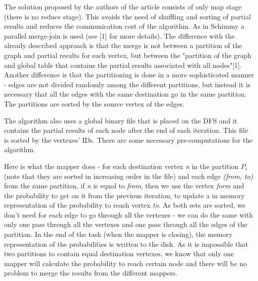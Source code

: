 \documentclass[12pt]{article}
\theoremstyle{plain}
\begin{document}
  The solution proposed by the authors of the article consists of only map
  stage (there is no reduce stage).  This avoids the need of shuffling and
  sorting of partial results and reduces the communication cost of the
  algorithm. As in Schimmy a parallel merge-join is used (see [1] for more
  details). The difference with the already described approach is that the
  merge is not between a partition of the graph and partial results for each
  vertex, but between the "partition of the graph and global table that
  contains the partial results associated with all nodes"[1]. Another
  difference is that the partitioning is done in a more sophisticated manner -
  edges are not divided randomly among the different partitions, but instead it
  is necessary that all the edges with the same destination go in the same
  partition. The partitions are sorted by the source vertex of the edges. 

  The algorithm also uses a global binary file that is placed on the DFS and it
  contains the partial results of each node after the end of each iteration. 
  This file is sorted by the vertexes' IDs. There are some necessary
  pre-computations for the algorithm.  

  Here is what the mapper does - for each destination vertex \emph{n} in the
  partition $P_i$ (note that they are sorted in increasing order in the file)
  and each edge \emph{(from, to)} from the same partition, if \emph{n} is equal
  to \emph{from}, then we use the vertex \emph{form} and the probability to
  get on it from the previous iteration, to update a in memory representation
  of the probability to reach vertex \emph{to}. As both sets are sorted, we
  don't need for each edge to go through all the vertexes - we can do the same
  with only one pass through all the vertexes and one pass through all the
  edges of the partition. In the end of the task (when the mapper is closing),
  the memory representation of the probabilities is written to the disk. As it
  is impossible that two partitions to contain equal destination vertexes, we
  know that only one mapper will calculate the probability to reach certain
  node and there will be no problem to merge the results from the different
  mappers. 
\end{document}
